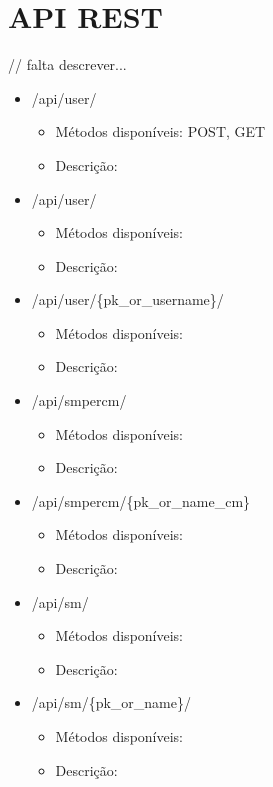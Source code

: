 \chapter{\acl{API} \acs{REST}}
\label{espcifAPIREST}

// falta descrever... 

\begin{itemize}
	\item /api/user/
		\begin{itemize}
			\item Métodos disponíveis: POST, GET
			\item Descrição: 
		\end{itemize}

	\item /api/user/
		\begin{itemize}
			\item Métodos disponíveis: 
			\item Descrição: 
		\end{itemize}
	
	\item /api/user/\{pk\_or\_username\}/
		\begin{itemize}
			\item Métodos disponíveis: 
			\item Descrição: 
		\end{itemize}
		
	\item /api/smpercm/
	\begin{itemize}
		\item Métodos disponíveis: 
		\item Descrição: 
	\end{itemize}
	
	
	
	\item /api/smpercm/\{pk\_or\_name\_cm\}
	\begin{itemize}
		\item Métodos disponíveis: 
		\item Descrição: 
	\end{itemize}
	
	
	\item /api/sm/
	\begin{itemize}
		\item Métodos disponíveis: 
		\item Descrição: 
	\end{itemize}
	
	
	\item /api/sm/\{pk\_or\_name\}/
	\begin{itemize}
		\item Métodos disponíveis: 
		\item Descrição: 
	\end{itemize}
	

\end{itemize}

